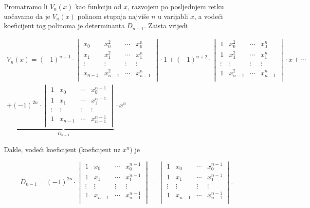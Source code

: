 Promatramo li $V_n(x)$ kao funkciju od $x$, razvojem po posljednjem retku uočavamo da je $V_n(x)$
polinom stupnja najviše $n$ u varijabli $x$, a vodeći koeficijent tog polinoma je determinanta $D_{n-1}$.
Zaista vrijedi

\begin{gather*}
V_n(x)=(-1)^{n+1}\cdot\begin{vmatrix}
    x_0&x_0^2&\cdots&x_0^n\\
    x_1&x_1^2&\cdots&x_1^n\\
    \vdots&\vdots&\vdots&\vdots\\
    x_{n-1}&x_{n-1}^2&\cdots&x_{n-1}^n\\
\end{vmatrix}\cdot1
+(-1)^{n+2}\cdot\begin{vmatrix}
    1&x_0^2&\cdots&x_0^n\\
    1&x_1^2&\cdots&x_1^n\\
    \vdots&\vdots&\vdots&\vdots\\
    1&x_{n-1}^2&\cdots&x_{n-1}^n\\
\end{vmatrix}\cdot x
+\cdots\\
+\underbrace{(-1)^{2n}\cdot\begin{vmatrix}
    1&x_0&\cdots&x_0^{n-1}\\
    1&x_1&\cdots&x_1^{n-1}\\
    \vdots&\vdots&\vdots&\vdots\\
    1&x_{n-1}&\cdots&x_{n-1}^{n-1}\\
\end{vmatrix}}_{D_{n-1}}\cdot x^n
\end{gather*}

Dakle, vodeći koeficijent (koeficijent uz $x^n$) je

\begin{equation}
\label{unique_poly_coeff}
D_{n-1} = (-1)^{2n}\cdot\begin{vmatrix}
    1&x_0&\cdots&x_0^{n-1}\\
    1&x_1&\cdots&x_1^{n-1}\\
    \vdots&\vdots&\vdots&\vdots\\
    1&x_{n-1}&\cdots&x_{n-1}^{n-1}\\
\end{vmatrix}=\begin{vmatrix}
    1&x_0&\cdots&x_0^{n-1}\\
    1&x_1&\cdots&x_1^{n-1}\\
    \vdots&\vdots&\vdots&\vdots\\
    1&x_{n-1}&\cdots&x_{n-1}^{n-1}\\
\end{vmatrix}.
\end{equation}

